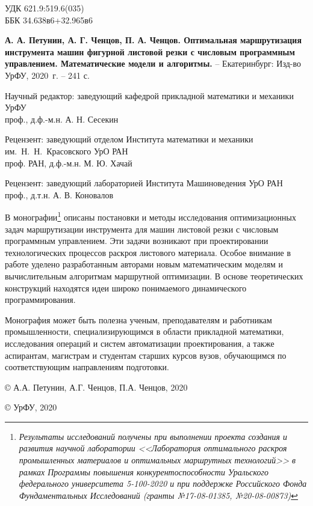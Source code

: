 
\thispagestyle{empty}
{
\setlength{\parindent}{0pt}
\setlength{\parskip}{1em}
\footnotesize

\noindent
УДК  621.9:519.6(035)
\\
ББК  34.638в6+32.965в6

\vspace{2em}

{\bf
А. А. Петунин,
А. Г. Ченцов,
П. А. Ченцов.
Оптимальная маршрутизация инструмента машин фигурной листовой резки
с числовым программным управлением.
Математические модели и алгоритмы.
}
--
Екатеринбург:
Изд-во УрФУ,
2020~г.
--
241 с.

\vspace{2em}

\begin{center}

Научный редактор:
заведующий кафедрой прикладной математики и механики УрФУ
\\
проф., д.ф.-м.н. А. Н. Сесекин

Рецензент:
заведующий отделом
Института математики и механики им.~Н.~Н.~Красовского УрО РАН
\\
проф. РАН, д.ф.-м.н. М. Ю. Хачай

Рецензент:
заведующий лабораторией Института Машиноведения УрО РАН
\\
проф., д.т.н. А. В. Коновалов
\end{center}

\vspace{1em}

В монографии\footnote{\it
  Результаты исследований получены при выполнении
  проекта создания и развития научной лаборатории
  <<Лаборатория оптимального раскроя промышленных материалов
  и оптимальных маршрутных технологий>>
  в рамках Программы повышения конкурентоспособности
  Уральского федерального университета
  5-100-2020
  и при поддержке Российского Фонда Фундаментальных Исследований
  (гранты №17-08-01385, №20-08-00873)
}
описаны постановки и методы исследования оптимизационных задач
маршрутизации инструмента для машин листовой резки
с числовым программным управлением.
Эти задачи возникают при проектировании технологических процессов
раскроя листового материала.
Особое внимание в работе уделено разработанным авторами
новым математическим моделям и вычислительным алгоритмам маршрутной оптимизации.
В основе теоретических конструкций находятся идеи
широко понимаемого динамического программирования.

Монография может быть полезна ученым, преподавателям и работникам промышленности,
специализирующимся в области прикладной математики,
исследования операций и систем автоматизации проектирования,
а также аспирантам, магистрам и студентам старших курсов вузов,
обучающимся по соответствующим направлениям подготовки.

\vspace{3em}
{
\setlength{\parindent}{0.5\linewidth}
\setlength{\parskip}{0em}
\scriptsize

\copyright
А.А. Петунин, А.Г. Ченцов, П.А. Ченцов, 2020

\copyright
УрФУ, 2020
}}

